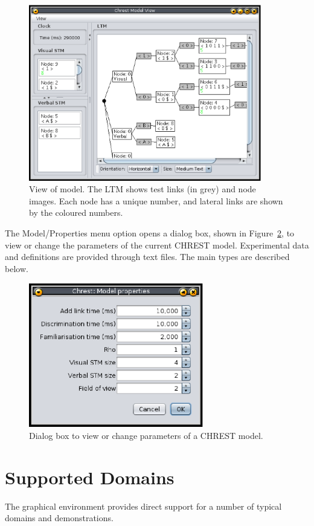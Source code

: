 \documentclass{article}
\begin{document}
\begin{figure}
\includegraphics[width=4.0in]{images/model-view.eps}
\caption{View of model.  The LTM shows test links (in grey) and node images.
Each node has a unique number, and lateral links are shown by the coloured
numbers.}
\label{model-view}
\end{figure}

The Model/Properties menu option opens a dialog box, shown in
Figure~\ref{properties}, to view or change the parameters of the current CHREST
model.  Experimental data and definitions are provided through text files.  The
main types are described below.

\begin{figure}
\includegraphics[width=3.0in]{images/properties.eps}
\caption{Dialog box to view or change parameters of a CHREST model.}
\label{properties}
\end{figure}

\section{Supported Domains}

The graphical environment provides direct support for a number of typical 
domains and demonstrations.
\end{document}
